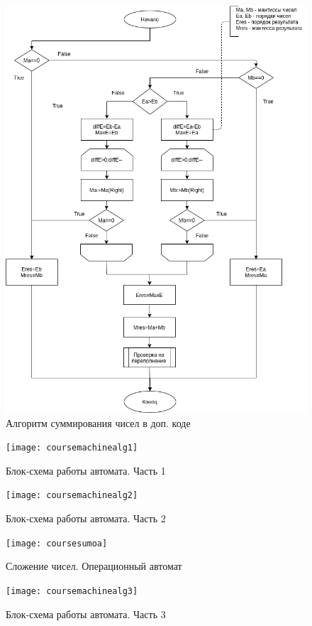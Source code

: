 \documentclass[a4paper,14pt]{extarticle}
\begin{document}
\begin{figure}[h!]
	\centering
	\includegraphics[width=0.7\linewidth]{images/course_algorithm_sum}
	\caption{Алгоритм суммирования чисел в доп. коде}
	\label{fig:coursealgorithmsum}
\end{figure}

\newpage
\begin{figure}[h!]
	\centering
	\texttt{[image: coursemachinealg1]}
	\caption {Блок-схема работы автомата. Часть 1}
	\label{fig:coursealgorithmmachine1}
\end{figure}

\newpage
\begin{figure}[h!]
	\centering
	\texttt{[image: coursemachinealg2]}
	\caption {Блок-схема работы автомата. Часть 2}
	\label{fig:coursealgorithmmachine2}
\end{figure}
\begin{figure}[h!]
	\centering
	\texttt{[image: coursesumoa]}
	\caption{Сложение чисел. Операционный автомат}
	\label{fig:courseoperationautomat2}
\end{figure}

\newpage
\begin{figure}[h!]
	\centering
	\texttt{[image: coursemachinealg3]}
	\caption {Блок-схема работы автомата. Часть 3}
	\label{fig:coursealgorithmmachine3}
\end{figure}
\end{document}
